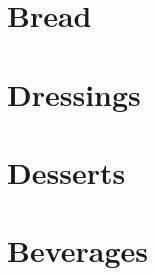 \documentclass[%
letter,
11pt
]{article}
\begin{document}
\section{Bread}








\section{Dressings}



\section{Desserts}










\section{Beverages}





\end{document}
